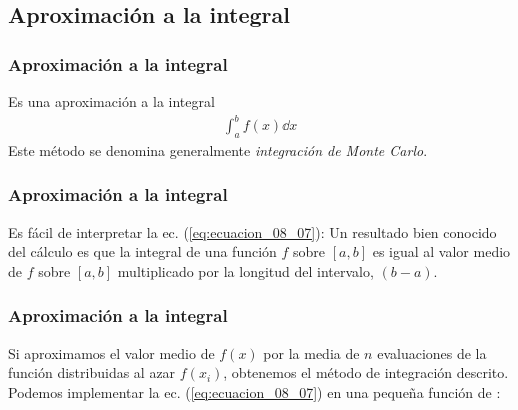 \subsection{Aproximación a la integral}
\begin{frame}
\frametitle{Aproximación a la integral}
Es una aproximación a la integral 
\begin{align}
\int_{a}^{b} f(x) \dd{x} 
\end{align}
Este método se denomina generalmente \emph{integración de Monte Carlo}.
\end{frame}
\begin{frame}
\frametitle{Aproximación a la integral}
Es fácil de interpretar la ec. (\ref{eq:ecuacion_08_07}): Un resultado bien conocido del cálculo es que la integral de una función $f$ sobre $[a, b]$ es igual al valor medio de $f$ sobre $[a, b]$ multiplicado por la longitud del intervalo, $(b - a)$.
\end{frame}
\begin{frame}
\frametitle{Aproximación a la integral}
Si aproximamos el valor medio de $f(x)$ por la media de $n$ evaluaciones de la función distribuidas al azar $f(x_{i})$, obtenemos el método de integración descrito.
\\
\bigskip
Podemos implementar la ec. (\ref{eq:ecuacion_08_07}) en una pequeña función de \python:
\end{frame}
